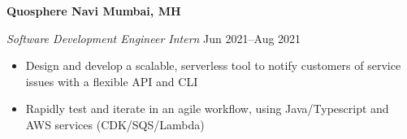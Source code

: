 \textbf{Quosphere \hfill Navi Mumbai, MH}\par

\textit{Software Development Engineer Intern} \hfill Jun 2021--Aug 2021
\begin{itemize}
	\item Design and develop a scalable, serverless tool to notify customers of service issues with a flexible API and CLI
	\item Rapidly test and iterate in an agile workflow, using Java/Typescript and AWS services (CDK/SQS/Lambda)
\end{itemize}\par